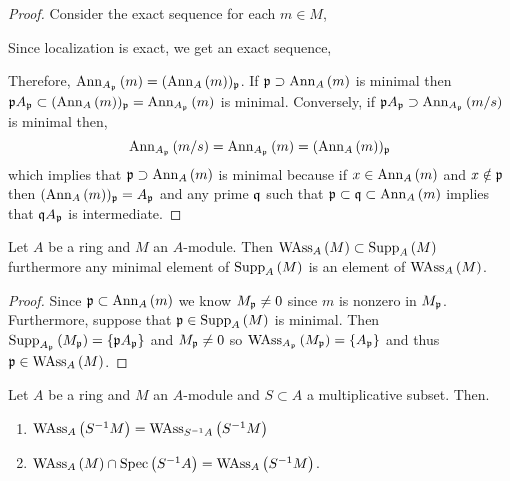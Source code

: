 \documentclass[12pt]{article}
\begin{document}
\begin{proof}
Consider the exact sequence for each $m \in M$,
\begin{center}
\end{center}
Since localization is exact, we get an exact sequence,
\begin{center}
\end{center}
Therefore, $\Ann{A_\p}{m} = (\Ann{A}{m})_\p$. If $\p \supset \Ann{A}{m}$ is minimal then $\p A_\p \subset (\Ann{A}{m})_\p = \Ann{A_\p}{m}$ is minimal. Conversely, if $\p A_\p \supset \Ann{A_\p}{m/s}$ is minimal then,
\[ \Ann{A_\p}{m/s} = \Ann{A_\p}{m} = (\Ann{A}{m})_\p \]
which implies that $\p \supset \Ann{A}{m}$ is minimal because if $x \in \Ann{A}{m}$ and $x \notin \p$ then $(\Ann{A}{m})_\p = A_\p$ and any prime $\q$ such that $\p \subset \q \subset \Ann{A}{m}$ implies that $\q A_\p$ is intermediate.
\end{proof}

\begin{lemma} \label{minimal_supp_wass}
Let $A$ be a ring and $M$ an $A$-module. Then $\WAss{A}{M} \subset \Supp{A}{M}$ furthermore any minimal element of $\Supp{A}{M}$ is an element of $\WAss{A}{M}$.
\end{lemma}

\begin{proof}
Since $\p \subset \Ann{A}{m}$ we know $M_\p \neq 0$ since $m$ is nonzero in $M_\p$. Furthermore, suppose that $\p \in \Supp{A}{M}$ is minimal. Then $\Supp{A_\p}{M_\p} = \{ \p A_\p \}$ and $M_\p \neq 0$ so $\WAss{A_\p}{M_\p} = \{ A_\p \}$ and thus $\p \in \WAss{A}{M}$.
\end{proof}


\begin{lemma} \label{ass_primes_localization}
Let $A$ be a ring and $M$ an $A$-module and $S \subset A$ a multiplicative subset. Then.
\begin{enumerate}
\item $\WAss{A}{S^{-1} M} = \WAss{S^{-1} A}{S^{-1} M}$ 
\item $\WAss{A}{M} \cap \Spec{S^{-1} A} = \WAss{A}{S^{-1} M}$.
\end{enumerate}
\end{lemma}
\end{document}
